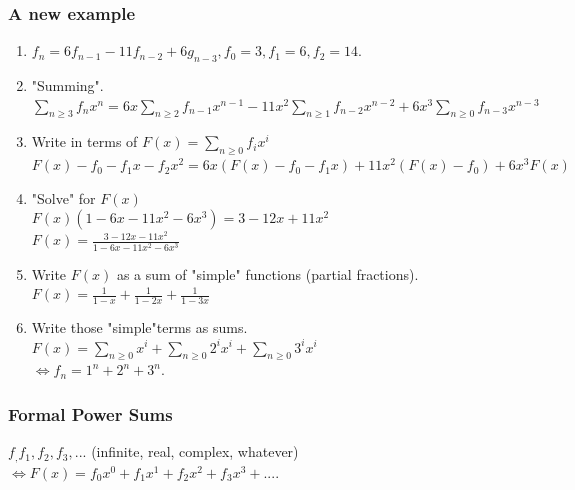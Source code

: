 \documentclass[12pt,a4paper]{article}
\begin{document}
\subsubsection{A new example}
\begin{enumerate}
	\item $f_n = 6 f_{n-1} - 11 f_{n-2} + 6 g_{n-3}, f_0 = 3, f_1 = 6, f_2 = 14$.
	\item "Summing".\\
	$\sum\limits_{n\geq 3}f_nx^n = 6x\sum\limits_{n\geq 2}f_{n-1}x^{n-1} - 11x^2\sum\limits_{n\geq 1}f_{n-2}x^{n-2} + 6x^3\sum\limits_{n\geq 0}f_{n-3}x^{n-3}$
	\item Write in terms of $F(x) = \sum\limits_{n\geq 0} f_ix^i$\\
	$F(x)-f_0-f_1x-f_2x^2 = 6x(F(x)-f_0-f_1x)+11x^2(F(x)-f_0) + 6x^3F(x)$
	\item "Solve" for $F(x)$\\
	$F(x)(1-6x-11x^2-6x^3)=3-12x+11x^2$\\
	$F(x) = \frac{3-12x-11x^2}{1-6x-11x^2-6x^3}$
	\item Write $F(x)$ as a sum of "simple" functions (partial fractions).\\
	$F(x) = \frac{1}{1-x} + \frac{1}{1-2x} + \frac{1}{1-3x}$
	\item Write those "simple"terms as sums.\\
	$F(x) = \sum\limits_{n\geq 0}x^i + \sum\limits_{n\geq 0}2^ix^i + \sum\limits_{n\geq 0}3^ix^i$\\
	$\iff f_n = 1^n+2^n+3^n$.
\end{enumerate}

\subsubsection{Formal Power Sums}
$f_,f_1,f_2,f_3,...$ (infinite, real, complex, whatever) $\iff F(x) = f_0x^0 + f_1x^1 +f_2x^2 +f_3x^3+....$
\end{document}
